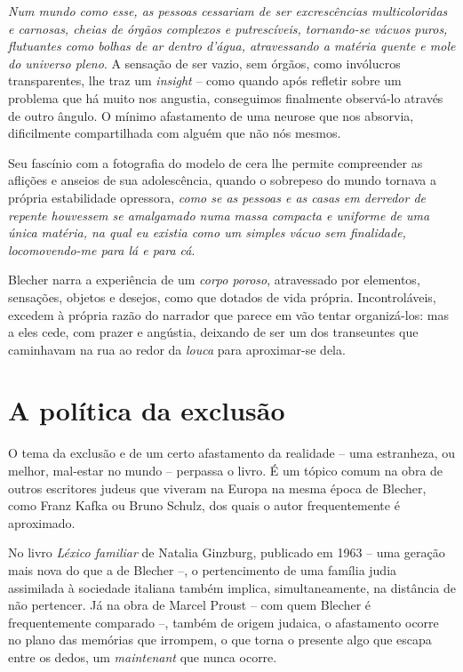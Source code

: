  \textit{Num mundo como esse, as pessoas cessariam de ser excrescências multicoloridas e carnosas, cheias de órgãos complexos e putrescíveis, tornando-se vácuos puros, flutuantes como bolhas de ar dentro d'água, atravessando a matéria quente e mole do universo pleno}. A sensação de ser vazio, sem órgãos, como invólucros transparentes, lhe traz um \textit{insight} -- como quando após refletir sobre um problema que há muito nos angustia, conseguimos finalmente observá-lo através de outro ângulo. O mínimo afastamento de uma neurose que nos absorvia, dificilmente compartilhada com alguém que não nós mesmos.

Seu fascínio com a fotografia do modelo de cera lhe permite compreender as aflições e anseios de sua adolescência, quando o sobrepeso do mundo tornava a própria estabilidade opressora, \textit{como se as pessoas e as casas em derredor de repente houvessem se amalgamado numa massa compacta e uniforme de uma única matéria, na qual eu existia como um simples vácuo sem finalidade, locomovendo-me para lá e para cá}.

Blecher narra a experiência de um \textit{corpo poroso}, atravessado por elementos, sensações, objetos e desejos, como que dotados de vida própria. Incontroláveis, excedem à própria razão do narrador que parece em vão tentar organizá-los: mas a eles cede, com prazer e angústia, deixando de ser um dos transeuntes que caminhavam na rua ao redor da \textit{louca} para aproximar-se dela.

\section{A política da exclusão}

O tema da exclusão e de um certo afastamento da realidade -- uma estranheza, ou melhor, mal-estar no mundo -- perpassa o livro. É um tópico comum na obra de outros escritores judeus que viveram na Europa na mesma época de Blecher, como Franz Kafka ou Bruno Schulz, dos quais o autor frequentemente é aproximado. 

No livro \textit{Léxico familiar} de Natalia Ginzburg, publicado em 1963 -- uma geração mais nova do que a de Blecher --, o pertencimento de uma família judia assimilada à sociedade italiana também implica, simultaneamente, na distância de não pertencer. Já na obra de Marcel Proust -- com quem Blecher é frequentemente comparado --, também de origem judaica, o afastamento ocorre no plano das memórias que irrompem, o que torna o presente algo que escapa entre os dedos, um \textit{maintenant} que nunca ocorre. 

